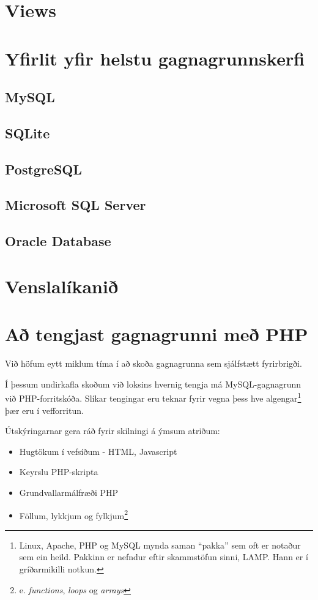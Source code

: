 \section{Views}
\section{Yfirlit yfir helstu gagnagrunnskerfi}
\subsection{MySQL}
\subsection{SQLite}
\subsection{PostgreSQL}
\subsection{Microsoft SQL Server}
\subsection{Oracle Database}
\section{Venslalíkanið}
\section{Að tengjast gagnagrunni með PHP}
Við höfum eytt miklum tíma í að skoða gagnagrunna sem sjálfstætt fyrirbrigði.

Í þessum undirkafla skoðum við loksins hvernig tengja má MySQL-gagnagrunn við PHP-forritskóða.
Slíkar tengingar eru teknar fyrir vegna þess hve algengar\footnote{Linux, Apache, PHP og MySQL mynda saman ``pakka'' sem oft er notaður sem ein heild. Pakkinn er nefndur eftir skammstöfun sinni, LAMP. Hann er í gríðarmikilli notkun.} þær eru í vefforritun.

Útskýringarnar gera ráð fyrir skilningi á ýmsum atriðum:
\begin{itemize}
 \item Hugtökum í vefsíðum - HTML, Javascript
 \item Keyrslu PHP-skripta
 \item Grundvallarmálfræði PHP
 \item Föllum, lykkjum og fylkjum\footnote{e. \emph{functions}, \emph{loops} og \emph{arrays}}
\end{itemize}
